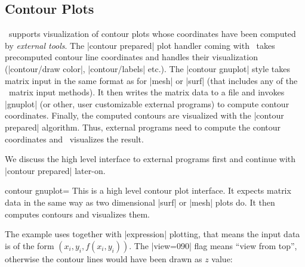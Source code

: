 {\subsection{Contour Plots}
{
%
%
\PGFPlots\ supports visualization of contour plots whose coordinates have been computed by \emph{external tools}. The |contour prepared| plot handler coming with \PGFPlots\ takes precomputed contour line coordinates and handles their visualization (|contour/draw color|, |contour/labels| etc.). The |contour gnuplot| style takes matrix input in the same format as for |mesh| or |surf| (that includes any of the \PGFPlots\ matrix input methods). It then writes the matrix data to a file and invokes |gnuplot| (or other, user customizable external programs) to compute contour coordinates. Finally, the computed contours are visualized with the |contour prepared| algorithm. Thus, external programs need to compute the contour coordinates and \PGFPlots\ visualizes the result.

We discuss the high level interface to external programs first and continue with |contour prepared| later-on.

\begin{plottype}[/pgfplots]{contour gnuplot=\textcolor{black}{}}
	This is a high level contour plot interface. It expects matrix data in the same way as two dimensional |surf| or |mesh| plots do. It then computes contours and visualizes them.
\pgfplotsexpensiveexample
\begin{codeexample}[]
\end{codeexample}
	\noindent The example uses  together with |expression| plotting, that means the input data is of the form $(x_i,y_i,f(x_i,y_i))$. The |view={0}{90}| flag means ``view from top'', otherwise the contour lines would have been drawn as $z$ value:
\pgfplotsexpensiveexample
\begin{codeexample}[]
\end{codeexample}


\end{plottype}}}
